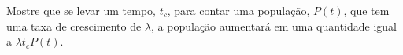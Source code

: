 Mostre que se levar um tempo, $t_c$, para contar uma população, $P(t)$, que tem uma taxa de crescimento de $\lambda$, a população aumentará em uma quantidade igual a $\lambda t_c P(t)$.
